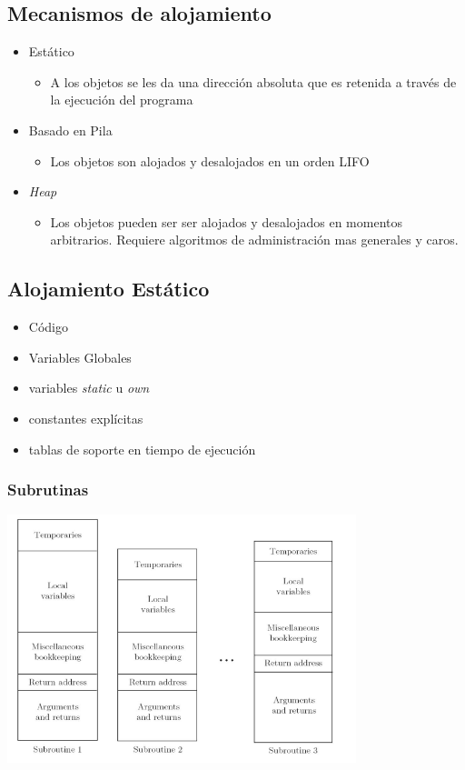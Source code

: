 \documentclass[11pt]{article}
\begin{document}
\subsection*{Mecanismos de alojamiento}
\label{sec:orgheadline3}
\begin{itemize}
\item Estático
\begin{itemize}
\item A los objetos se les da una dirección absoluta que es retenida a
través de la ejecución del programa
\end{itemize}
\item Basado en Pila
\begin{itemize}
\item Los objetos son alojados y desalojados en un orden LIFO
\end{itemize}
\item \emph{Heap}
\begin{itemize}
\item Los objetos pueden ser ser alojados y desalojados en momentos
arbitrarios. Requiere algoritmos de administración mas generales y caros.
\end{itemize}
\end{itemize}

\subsection*{Alojamiento Estático}
\label{sec:orgheadline5}
\begin{itemize}
\item Código
\item Variables Globales
\item variables \emph{static} u \emph{own}
\item constantes explícitas
\item tablas de soporte en tiempo de ejecución
\end{itemize}

\subsubsection*{Subrutinas}
\label{sec:orgheadline4}
\includegraphics[width=4in]{aljamestaticosub.png}
\end{document}
